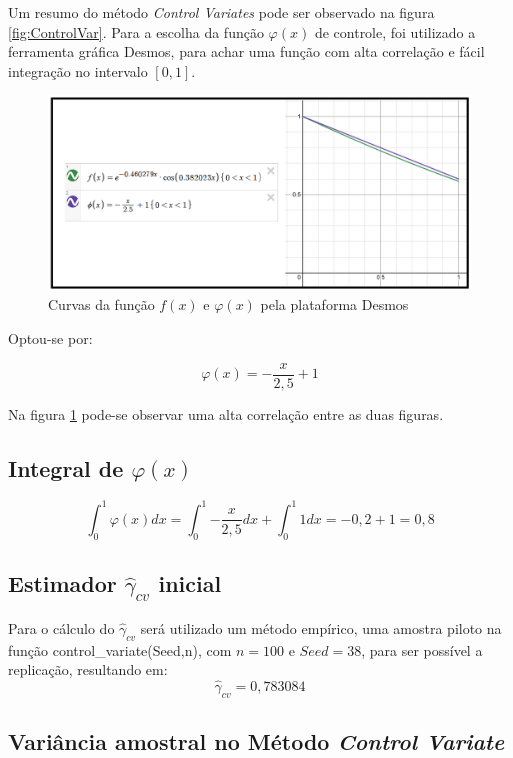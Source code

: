 \documentclass{article}
\begin{document}
Um resumo do método \textit{Control Variates} pode ser observado na figura \ref{fig:ControlVar}.
\newline
Para a escolha da função $\varphi(x)$ de controle, foi utilizado a ferramenta gráfica Desmos\cite{desmos}, para achar uma função com alta correlação e fácil integração no intervalo $[0,1]$.

\begin{figure}[H]
    \centering
    \includegraphics[width=.7\linewidth]{Imagens/Desmos_ControlVariate.png}
    \caption{Curvas da função $f(x)$ e $\varphi(x)$ pela plataforma Desmos}
    \label{fig:ControlVar_desmos}
\end{figure}

Optou-se por:

\begin{equation*}
    \varphi(x) = -\frac{x}{2,5}+1
\end{equation*}

Na figura \ref{fig:ControlVar_desmos} pode-se observar uma alta correlação entre as duas figuras.

\subsection{Integral de $\varphi(x)$}

\begin{equation*}
    \int_0^1{\varphi(x) dx} = \int_0^1{-\frac{x}{2,5}}dx+\int_0^1{1}dx = -0,2 + 1 = 0,8
\end{equation*}

\subsection{Estimador $\hat{\gamma}_{cv}$ inicial}
Para o cálculo do $\hat{\gamma}_{cv}$ será utilizado um método empírico, uma amostra piloto na função control\_variate(Seed,n), com $n=100$ e $Seed=38$, para ser possível a replicação, resultando em:
\[
    \hat{\gamma}_{cv} = 0,783084
\]

\subsection{Variância amostral no Método \textit{Control Variate}}
\end{document}
